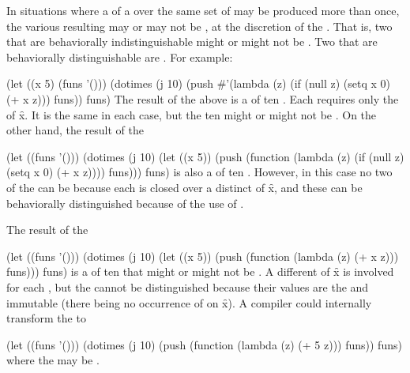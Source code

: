                      
In situations where a  of a 
 over the same set of  may be
produced more than once, the various resulting  may
or may not be , at the discretion of the .
That is, two  that are behaviorally
indistinguishable might or might not be .
Two  that are behaviorally distinguishable are .
For example:
 
\code
 (let ((x 5) (funs '()))
   (dotimes (j 10)                          
     (push #'(lambda (z)                        
               (if (null z) (setq x 0) (+ x z)))
           funs))
   funs)
\endcode
The result of the above  is a  of ten .
Each requires only the  of \f{x}.
It is the same  in each case, 
but the ten   might or might not be .
On the other hand, the result of the 
 
\code
 (let ((funs '()))     
   (dotimes (j 10)
     (let ((x 5))
       (push (function (lambda (z)
                        (if (null z) (setq x 0) (+ x z))))
             funs)))
  funs)
\endcode
is also a  of ten .
However, in this case no two of the   can
be  because each  is closed over a distinct
 of \f{x}, and these  can be behaviorally
distinguished because of the use of .
 
The result of the 
 
\code
 (let ((funs '()))
   (dotimes (j 10)
     (let ((x 5))
       (push (function (lambda (z) (+ x z)))
            funs)))
   funs)
\endcode
is a  of ten   that
might or might not be .
A different  of \f{x} is involved for
each , but the  cannot be distinguished
because their values are the  and immutable (there being no occurrence
of  on \f{x}).  A compiler could internally
transform the  to
 
\code
 (let ((funs '()))
   (dotimes (j 10)
     (push (function (lambda (z) (+ 5 z)))
           funs))
  funs)
\endcode
where the  may be .
 
